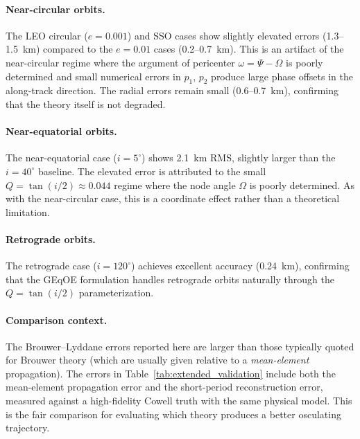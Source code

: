\documentclass[11pt]{article}
\begin{document}
\paragraph{Near-circular orbits.}
The LEO circular ($e = 0.001$) and SSO cases show slightly elevated errors
(1.3--1.5~km) compared to the $e = 0.01$ cases (0.2--0.7~km). This is an
artifact of the near-circular regime where the argument of pericenter
$\omega = \Psi - \Omega$ is poorly determined and small numerical errors in
$p_1$, $p_2$ produce large phase offsets in the along-track direction. The
radial errors remain small (0.6--0.7~km), confirming that the theory itself
is not degraded.

\paragraph{Near-equatorial orbits.}
The near-equatorial case ($i = 5^\circ$) shows 2.1~km RMS, slightly larger
than the $i = 40^\circ$ baseline. The elevated error is attributed to the
small $Q = \tan(i/2) \approx 0.044$ regime where the node angle $\Omega$ is
poorly determined. As with the near-circular case, this is a coordinate effect
rather than a theoretical limitation.

\paragraph{Retrograde orbits.}
The retrograde case ($i = 120^\circ$) achieves excellent accuracy (0.24~km),
confirming that the GEqOE formulation handles retrograde orbits naturally
through the $Q = \tan(i/2)$ parameterization.

\paragraph{Comparison context.}
The Brouwer--Lyddane errors reported here are larger than those typically
quoted for Brouwer theory (which are usually given relative to
a \emph{mean-element} propagation). The errors in
Table~\ref{tab:extended_validation} include both the mean-element propagation
error and the short-period reconstruction error, measured against a
high-fidelity Cowell truth with the same physical model. This is the
fair comparison for evaluating which theory produces a better osculating
trajectory.
\end{document}
